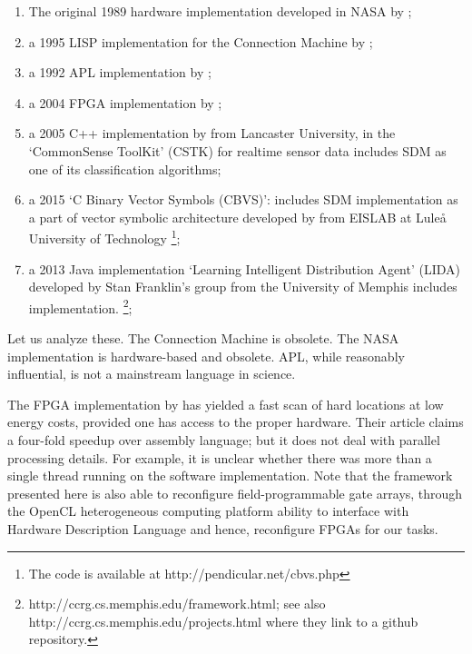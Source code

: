\begin{enumerate}
    \item The original 1989 hardware implementation developed in NASA by \citet{flynn_sparse_1989};

    \item a 1995 LISP implementation for the Connection Machine by \citet{turk_kanervas_1995};

    \item a 1992 APL implementation by \citet{surkan_wsdm:_1992};

    \item a 2004 FPGA implementation by \citet{silva_reconfigurable_2004};

    \item a 2005 C++ implementation by \citet{berchtold_processing_2005} from Lancaster University, in the `CommonSense ToolKit' (CSTK) \citep{noauthor_cstk:_nodate} for realtime sensor data includes SDM as one of its classification algorithms;

    \item  a 2015 `C Binary Vector Symbols (CBVS)':  includes SDM implementation as a part of  vector symbolic architecture developed by \citet{emruli_vector_2015} from EISLAB at Luleå University of Technology \footnote{The code is available at http://pendicular.net/cbvs.php};

    \item a 2013 Java implementation `Learning Intelligent Distribution Agent' (LIDA) developed by \citep{franklin_lida:_2014, snaider_integer_2013, snaider_modular_2014} Stan Franklin's group from the University of Memphis includes implementation. \footnote{http://ccrg.cs.memphis.edu/framework.html; see also http://ccrg.cs.memphis.edu/projects.html where they link to a github repository.};

\end{enumerate}

Let us analyze these.  The Connection Machine is obsolete.  The NASA implementation is hardware-based and obsolete.  APL, while reasonably influential, is not a mainstream language in science.

The FPGA implementation by \citet{silva_reconfigurable_2004} has yielded a fast scan of hard locations at low energy costs, provided one has access to the proper hardware. Their article claims a four-fold speedup over assembly language; but it does not deal with parallel processing details.  For example, it is unclear whether there was more than a single thread running on the software implementation.  Note that the framework presented here is also able to reconfigure field-programmable gate arrays, through the OpenCL heterogeneous computing platform ability to interface with Hardware Description Language and hence, reconfigure FPGAs \citep{waidyasooriya2018design, czajkowski_opencl_2012} for our tasks.

